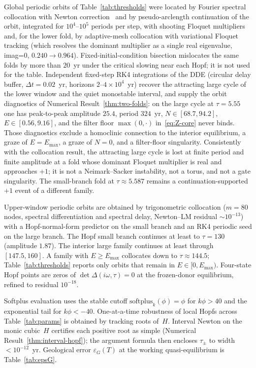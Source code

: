 \documentclass[11pt]{article}
\theoremstyle{definition}
\begin{document}
Global periodic orbits of Table~\ref{tab:thresholds} were located by Fourier spectral collocation with Newton correction~\cite{engelborghs2002} and by pseudo-arclength continuation of the orbit, integrated for $10^4$--$10^5$ periods per step, with shooting Floquet multipliers and, for the lower fold, by adaptive-mesh collocation with variational Floquet tracking (which resolves the dominant multiplier as a single real eigenvalue, imag=0, $0.240\to0.964$). Fixed-initial-condition bisection mislocates the same folds by more than $20$~yr under the critical slowing near each Hopf; it is not used for the table. Independent fixed-step RK4 integrations of the DDE (circular delay buffer, $\Delta t=0.02$~yr, horizons $2$--$4\times 10^4$~yr) recover the attracting large cycle of the lower window and the quiet monostable interval, and supply the orbit diagnostics of Numerical Result~\ref{thm:two-folds}: on the large cycle at $\tau=5.55$ one has peak-to-peak amplitude $25.4$, period $324$~yr, $N\in[68.7,94.2]$, $E\in[0.56,9.16]$, and the filter floor $\max(0,\cdot)$ in~\eqref{eq:Z-core} never binds. Those diagnostics exclude a homoclinic connection to the interior equilibrium, a graze of $E=E_{\max}$, a graze of $N=0$, and a filter-floor singularity. Consistently with the collocation result, the attracting large cycle is lost at finite period and finite amplitude at a fold whose dominant Floquet multiplier is real and approaches $+1$; it is not a Neimark--Sacker instability, not a torus, and not a gate singularity. The small-branch fold at $\tau\approx 5.587$ remains a continuation-supported $+1$ event of a different family.

Upper-window periodic orbits are obtained by trigonometric collocation ($m=80$ nodes, spectral differentiation and spectral delay, Newton--LM residual $\sim 10^{-13}$) with a Hopf-normal-form predictor on the small branch and an RK4 periodic seed on the large branch. The Hopf small branch continues at least to $\tau=130$ (amplitude $1.87$). The interior large family continues at least through $[147.5,160]$. A family with $E\ge E_{\max}$ collocates down to $\tau\approx 144.5$; Table~\ref{tab:thresholds} reports only orbits that remain in $E\in[0,E_{\max})$. Four-state Hopf points are zeros of $\det\Delta(i\omega,\tau)=0$ at the frozen-donor equilibrium, refined to residual $10^{-18}$.

Softplus evaluation uses the stable cutoff $\mathrm{softplus}_k(\phi)=\phi$ for $k\phi>40$ and the exponential tail for $k\phi<-40$. One-at-a-time robustness of local Hopfs across Table~\ref{tab:params} is obtained by tracking roots of~$H$. Interval Newton on the monic cubic~$H$ certifies each positive root as simple (Numerical Result~\ref{thm:interval-hopf}); the argument formula then encloses $\tau_\pm$ to width $<10^{-12}$~yr. Geological error $\varepsilon_G(T)$ at the working quasi-equilibrium is Table~\ref{tab:epsG}.
\end{document}
